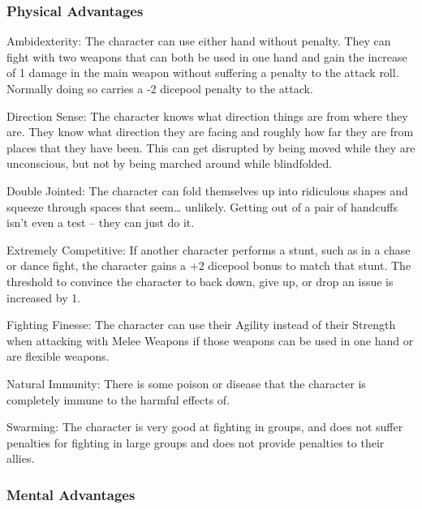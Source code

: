 \subsubsection{Physical Advantages}

\begin{description*}
\item[Ambidexterity:] The character can use either hand without penalty. They can fight with two weapons that can both be used in one hand and gain the increase of 1 damage in the main weapon without suffering a penalty to the attack roll. Normally doing so carries a -2 dicepool penalty to the attack.
\item[Direction Sense:] The character knows what direction things are from where they are. They know what direction they are facing and roughly how far they are from places that they have been. This can get disrupted by being moved while they are unconscious, but not by being marched around while blindfolded.
\item[Double Jointed:] The character can fold themselves up into ridiculous shapes and squeeze through spaces that seem\ldots{} unlikely. Getting out of a pair of handcuffs isn't even a test -- they can just do it.
\item[Extremely Competitive:] If another character performs a stunt, such as in a chase or dance fight, the character gains a +2 dicepool bonus to match that stunt. The threshold to convince the character to back down, give up, or drop an issue is increased by 1.
\item[Fighting Finesse:] The character can use their Agility instead of their Strength when attacking with Melee Weapons if those weapons can be used in one hand or are flexible weapons.
\item[Natural Immunity:] There is some poison or disease that the character is completely immune to the harmful effects of.
\item[Swarming:] The character is very good at fighting in groups, and does not suffer penalties for fighting in large groups and does not provide penalties to their allies.
\end{description*}

\subsubsection{Mental Advantages}

